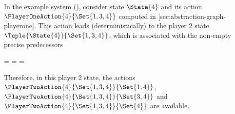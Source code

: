     In the example system (), consider state $\State{4}$ and its action $\PlayerOneAction{4}{\Set{1, 3, 4}}$ computed in [sec:abstraction-graph-playerone].
    This action leads (deterministically) to the player 2 state $\Tuple{\State{4}}{\Set{1, 3, 4}}$, which is associated with the non-empty precise predecessors

    \startformula
        \startalign[n=2,align={left,left}]
            \NC {}
            \NC =  \EndComma
            \NR
            \NC {}
            \NC =  \EndAnd
            \NR
            \NC {}
            \NC =  \EndPeriod
            \NR
        \stopalign
    \stopformula

    Therefore, in this player 2 state, the actions $\PlayerTwoAction{4}{\Set{1, 3, 4}}{\Set{1, 4}}$, $\PlayerTwoAction{4}{\Set{1, 3, 4}}{\Set{3, 4}}$ and $\PlayerTwoAction{4}{\Set{1, 3, 4}}{\Set{4}}$ are available.

\stopsubsection


